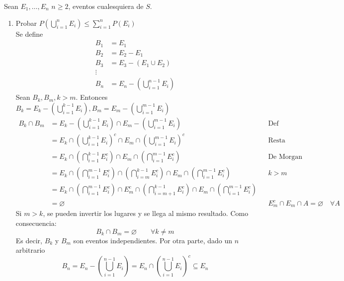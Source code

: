 \item Sean $E_1,\dots,E_n$ $n\geq2$, eventos cualesquiera de $S$.
    \begin{enumerate}
        \item Probar $P\left(\bigcup\limits_{i=1}^n E_i\right)\leq \sum\limits_{i=1}^nP(E_i)$\e\\
            Se define
            \begin{align*}
                B_1&=E_1\\
                B_2&=E_2-E_1\\
                B_3&=E_3-(E_1\cup E_2)\\
                \vdots\\
                B_n&=E_n-\left(\bigcup_{i=1}^{n-1}E_i\right)
            \end{align*}
            Sean $B_k,B_m, k>m$. Entonces $B_k=E_k-\left(\bigcup\limits_{i=1}^{k-1}E_i\right), B_m=E_m-\left(\bigcup\limits_{i=1}^{m-1}E_i\right)$
            \begin{align*}
                B_k\cap B_m&=E_k-\left(\bigcup_{i=1}^{k-1}E_i\right)\cap E_m-\left(\bigcup_{i=1}^{m-1}E_i\right)&&\text{Def}\\
                &=E_k\cap\left(\bigcup_{i=1}^{k-1}E_i\right)^c\cap E_m\cap\left(\bigcup_{i=1}^{m-1}E_i\right)^c&&\text{Resta}\\
                &=E_k\cap\left(\bigcap_{i=1}^{k-1}E_i^c\right)\cap E_m\cap\left(\bigcap_{i=1}^{m-1}E_i^c\right)&&\text{De Morgan}\\
                &=E_k\cap\left(\bigcap_{i=1}^{m-1}E_i^c\right)\cap\left(\bigcap_{i=m}^{k-1}E_i^c\right)\cap E_m\cap\left(\bigcap_{i=1}^{m-1}E_i^c\right)&&k>m\\
                &=E_k\cap\left(\bigcap_{i=1}^{m-1}E_i^c\right)\cap E_m^c\cap\left(\bigcap_{i=m+1}^{k-1}E_i^c\right)\cap E_m\cap\left(\bigcap_{i=1}^{m-1}E_i^c\right)\\
                &=\varnothing&&E_m^c\cap E_m\cap A=\varnothing\quad \forall A
            \end{align*}
            Si $m>k$, se pueden invertir los lugares y se llega al mismo resultado. Como consecuencia:
            \begin{equation}
                B_k\cap B_m=\varnothing\qquad\forall k\neq m
            \end{equation}
            Es decir, $B_k$ y $B_m$ son eventos independientes. Por otra parte, dado un $n$ arbitrario
            \[
                B_n=E_n-\left(\bigcup_{i=1}^{n-1}E_i\right)=E_n\cap\left(\bigcup_{i=1}^{n-1}E_i\right)^c\subseteq E_n
\]
\end{enumerate}
